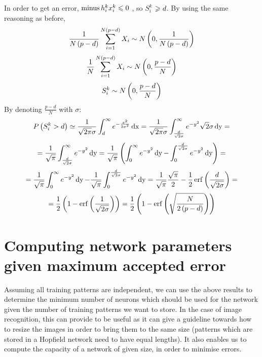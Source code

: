 In order to get an error, $\operatorname{minus} h^k_i x^k_i \leqslant 0 $ ,
so $S^k_i$ $\geqslant d $. By using the same reasoning as before,
\[ \frac{1}{N \left( p - d \right)} \sum_{i = 1}^{N \left( p - d \right)} X_i
   \sim N \left( 0 , \frac{1}{N \left( p - d \right)} \right) \]
\[ \frac{1}{N} \sum_{i = 1}^{N \left( p - d \right)} X_i \sim N \left( 0
   , \frac{p - d}{N} \right) \]
\[ S^k_i \sim N \left( 0 , \frac{p - d}{N} \right) \]
By denoting $\frac{p - d}{N}$ with $\sigma :$
\[ P \left( S^k_i > d \right) \simeq \frac{1}{\sqrt{2 \pi} \sigma}
   \int^{\infty}_d e^{- \frac{x^2}{2 \sigma^2}} \operatorname{dx} = \frac{1}{\sqrt{2
   \pi} \sigma} \int^{\infty}_{\frac{d}{\sqrt{2} \sigma}} e^{- y^2}
   \sqrt{2} \sigma \operatorname{dy} = \]
\[ = \frac{1}{\sqrt{\pi}} \int^{\infty}_{\frac{d}{\sqrt{2} \sigma}} e^{-
   y^2} \operatorname{dy} = \frac{1}{\sqrt{\pi}} \left( \int^{\infty}_0 e^{- y^2}
   \operatorname{dy} - \int^{\frac{d}{\sqrt{2} \sigma}}_0 e^{- y^2} \operatorname{dy} \right)
   = \]
\[ = \frac{1}{\sqrt{\pi}} \int^{\infty}_0 e^{- y^2} \operatorname{dy} -
   \frac{1}{\sqrt{\pi}} \int^{\frac{d}{\sqrt{2} \sigma}}_0 e^{- y^2}
   \operatorname{dy} = \frac{1}{\sqrt{\pi}}  \frac{\sqrt{\pi}}{2}  -
   \frac{1}{2} \operatorname{erf} \left( \frac{d}{\sqrt{2 \sigma}} \right) = \]
\[ = \frac{1}{2} \left( 1   - \operatorname{erf} \left( \frac{1}{\sqrt{2
   \sigma}} \right) \right) = \frac{1}{2} \left( 1   -
   {\operatorname{erf}} \left( \sqrt{\frac{N}{2 \left( p - d \right)}}
   \right) \right)  \]


\section{Computing network parameters given maximum accepted error}

Assuming all training patterns are independent, we can use the above results
to determine the minimum number of neurons which should be used for the
network given the number of training patterns we want to store. In the case of
image recognition, this can provide to be useful as it can give a guideline
towards how to resize the images in order to bring them to the same size
(patterns which are stored in a Hopfield network need to have equal lengths).
It also enables us to compute the capacity of a network of given size, in
order to minimise errors.

